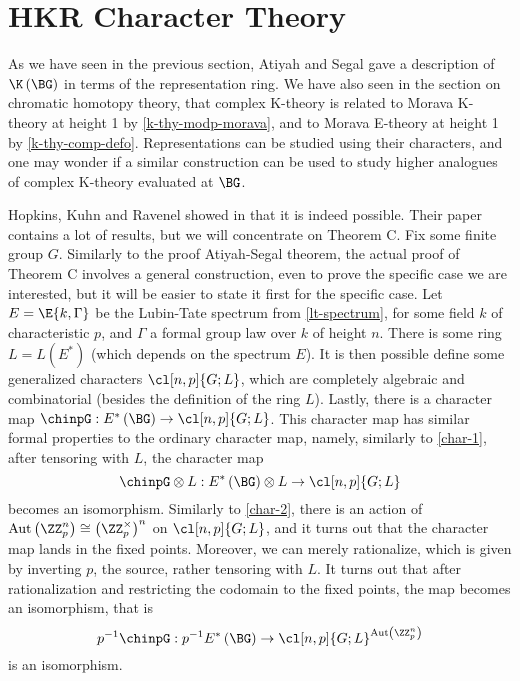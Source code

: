 \section{HKR Character Theory}

As we have seen in the previous section, Atiyah and Segal gave a description of $\K\left(\BG\right)$ in terms of the representation ring.
We have also seen in the section on chromatic homotopy theory, that complex K-theory is related to Morava K-theory at height 1 by \ref{k-thy-modp-morava}, and to Morava E-theory at height 1 by \ref{k-thy-comp-defo}.
Representations can be studied using their characters, and one may wonder if a similar construction can be used to study higher analogues of complex K-theory evaluated at $\BG$.

Hopkins, Kuhn and Ravenel showed in \cite{HKR} that it is indeed possible.
Their paper contains a lot of results, but we will concentrate on Theorem C.
Fix some finite group $G$.
Similarly to the proof Atiyah-Segal theorem, the actual proof of Theorem C involves a general construction, even to prove the specific case we are interested, but it will be easier to state it first for the specific case.
Let $E = \E{k, \Gamma}$ be the Lubin-Tate spectrum from \ref{lt-spectrum}, for some field $k$ of characteristic $p$, and $\Gamma$ a formal group law over $k$ of height $n$. 
There is some ring $L = L\left(E^*\right)$ (which depends on the spectrum $E$).
It is then possible define some generalized characters $\cl[n,p]{G; L}$, which are completely algebraic and combinatorial (besides the definition of the ring $L$).
Lastly, there is a character map $\chinpG: E^*\left(\BG\right) \to \cl[n,p]{G; L}$.
This character map has similar formal properties to the ordinary character map, namely, similarly to \ref{char-1}, after tensoring with $L$, the character map
$$
\chinpG \otimes L:
E^*\left(\BG\right) \otimes L
\to \cl[n,p]{G; L}
$$
becomes an isomorphism.
Similarly to \ref{char-2}, there is an action of $\aut\left(\ZZ_p^n\right) \cong \left(\ZZ_p^\times\right)^n$ on $\cl[n,p]{G; L}$, and it turns out that the character map lands in the fixed points.
Moreover, we can merely rationalize, which is given by inverting $p$, the source, rather tensoring with $L$.
It turns out that after rationalization and restricting the codomain to the fixed points, the map becomes an isomorphism, that is
$$
p^{-1} \chinpG:
p^{-1} E^*\left(\BG\right)
\to \cl[n,p]{G; L}^{\aut\left(\ZZ_p^n\right)}
$$
is an isomorphism.

